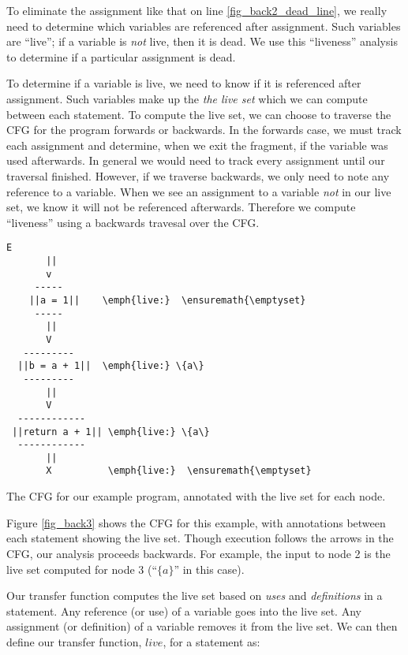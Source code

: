 \documentclass[12pt]{report}
\begin{document}
To eliminate the assignment like that on line
\ref{fig_back2_dead_line}, we really need to determine which variables
are referenced after assignment. Such variables are ``live''; if a
variable is \emph{not} live, then it is dead. We use this ``liveness''
analysis to determine if a particular assignment is dead.

To determine if a variable is live, we need to know if it is
referenced after assignment.  Such variables make up the \emph{the
  live set} which we can compute between each statement. To compute
the live set, we can choose to traverse the CFG for the program forwards or
backwards.  In the forwards case, we must track each assignment and
determine, when we exit the fragment, if the variable was used
afterwards. In general we would need to track every assignment until
our traversal finished. However, if we traverse backwards, we only
need to note any reference to a variable. When we see an assignment to
a variable \emph{not} in our live set, we know it will not be
referenced afterwards. Therefore we compute ``liveness'' using a
backwards travesal over the CFG.

\begin{myfig}[th]
\begin{minipage}{2in}
\begin{Verbatim}[commandchars=\\\{\}]
       E
       ||      
       v
     -----
    ||a = 1||    \emph{live:}  \ensuremath{\emptyset}
     -----
       ||      
       V
   ---------
  ||b = a + 1||  \emph{live:} \{a\}  
   ---------
       ||      
       V
  ------------
 ||return a + 1|| \emph{live:} \{a\}
  ------------
       ||      
       X          \emph{live:}  \ensuremath{\emptyset}
\end{Verbatim}
\end{minipage}
\caption{The CFG for our example program, annotated with the live
set for each node.}
\label{fig_back3}
\end{myfig}

Figure \ref{fig_back3} shows the CFG for this example, with annotations
between each statement showing the live set. Though
execution follows the arrows in the CFG, our analysis proceeds
backwards. For example, the input to node 2 is the live set computed
for node 3 (``$\{a\}$'' in this case).

Our transfer function computes the live set based on \emph{uses} and
\emph{definitions} in a statement. Any reference (or use) of a
variable goes into the live set. Any assignment (or definition) of a
variable removes it from the live set. We can then define our transfer
function, $live$, for a statement as:
\end{document}
